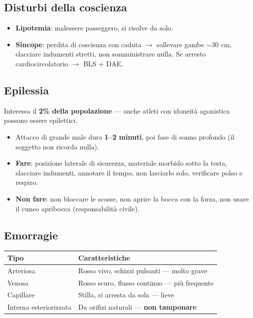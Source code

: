 \documentclass[12pt, a4paper]{article}
\begin{document}
\subsection{Disturbi della coscienza}

\begin{itemize}
  \item \textbf{Lipotemia}: malessere passeggero, si risolve da solo.
  \item \textbf{Sincope}: perdita di coscienza con caduta $\rightarrow$ sollevare gambe $\sim$30 cm, slacciare indumenti stretti, non somministrare nulla. Se arresto cardiocircolatorio $\rightarrow$ BLS + DAE.
\end{itemize}

\subsection{Epilessia}

Interessa il \textbf{2\% della popolazione} --- anche atleti con idoneità agonistica possono essere epilettici.

\begin{itemize}
  \item Attacco di grande male dura \textbf{1--2 minuti}, poi fase di sonno profondo (il soggetto non ricorda nulla).
  \item \textbf{Fare}: posizione laterale di sicurezza, materiale morbido sotto la testa, slacciare indumenti, annotare il tempo, non lasciarlo solo, verificare polso e respiro.
  \item \textbf{Non fare}: non bloccare le scosse, non aprire la bocca con la forza, non usare il cuneo apribocca (responsabilità civile).
\end{itemize}

\subsection{Emorragie}

\begin{tabularx}{\textwidth}{lX}
\toprule
\rowcolor{light} \textbf{Tipo} & \textbf{Caratteristiche} \\
\midrule
Arteriosa & Rosso vivo, schizzi pulsanti --- molto grave \\
Venosa & Rosso scuro, flusso continuo --- più frequente \\
Capillare & Stilla, si arresta da sola --- lieve \\
Interna esteriorizzata & Da orifizi naturali --- \textbf{non tamponare} \\
\bottomrule
\end{tabularx}
\end{document}
